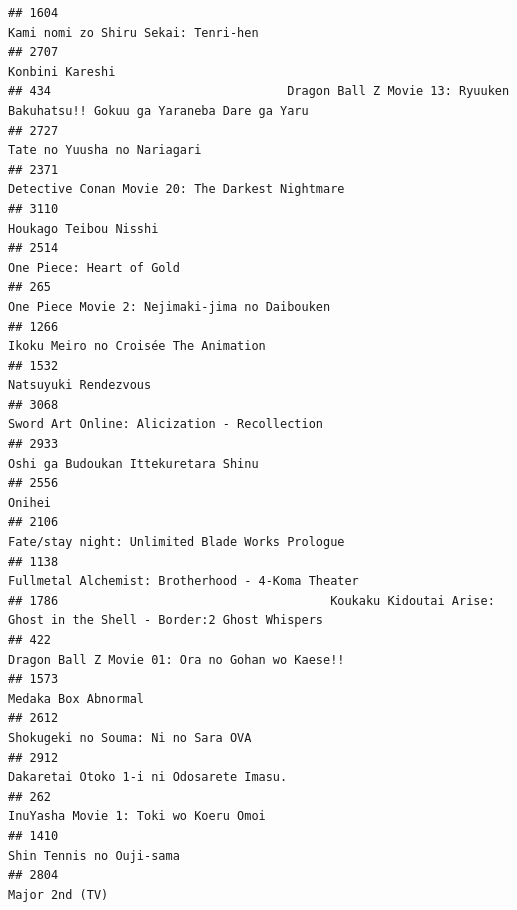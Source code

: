 \documentclass[
]{article}
\begin{document}
\begin{verbatim}
## 1604                                                                       Kami nomi zo Shiru Sekai: Tenri-hen
## 2707                                                                                           Konbini Kareshi
## 434                                 Dragon Ball Z Movie 13: Ryuuken Bakuhatsu!! Gokuu ga Yaraneba Dare ga Yaru
## 2727                                                                               Tate no Yuusha no Nariagari
## 2371                                                           Detective Conan Movie 20: The Darkest Nightmare
## 3110                                                                                     Houkago Teibou Nisshi
## 2514                                                                                  One Piece: Heart of Gold
## 265                                                              One Piece Movie 2: Nejimaki-jima no Daibouken
## 1266                                                                      Ikoku Meiro no Croisée The Animation
## 1532                                                                                      Natsuyuki Rendezvous
## 3068                                                              Sword Art Online: Alicization - Recollection
## 2933                                                                       Oshi ga Budoukan Ittekuretara Shinu
## 2556                                                                                                    Onihei
## 2106                                                           Fate/stay night: Unlimited Blade Works Prologue
## 1138                                                         Fullmetal Alchemist: Brotherhood - 4-Koma Theater
## 1786                                      Koukaku Kidoutai Arise: Ghost in the Shell - Border:2 Ghost Whispers
## 422                                                            Dragon Ball Z Movie 01: Ora no Gohan wo Kaese!!
## 1573                                                                                       Medaka Box Abnormal
## 2612                                                                        Shokugeki no Souma: Ni no Sara OVA
## 2912                                                                   Dakaretai Otoko 1-i ni Odosarete Imasu.
## 262                                                                       InuYasha Movie 1: Toki wo Koeru Omoi
## 1410                                                                                  Shin Tennis no Ouji-sama
## 2804                                                                                            Major 2nd (TV)

\end{verbatim}
\end{document}
